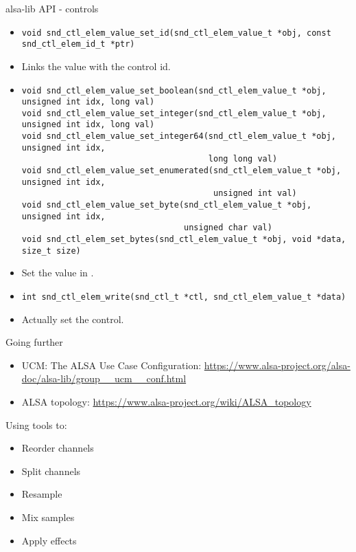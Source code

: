 \begin{frame}[fragile]{alsa-lib API - controls}
  \begin{itemize}
  \item
    \begin{block}{}
    \fontsize{9}{9}\selectfont
      \begin{verbatim}
void snd_ctl_elem_value_set_id(snd_ctl_elem_value_t *obj, const snd_ctl_elem_id_t *ptr)
      \end{verbatim}
    \end{block}
    \item Links the value with the control id.
  \item
    \begin{block}{}
    \fontsize{9}{9}\selectfont
      \begin{verbatim}
void snd_ctl_elem_value_set_boolean(snd_ctl_elem_value_t *obj, unsigned int idx, long val)
void snd_ctl_elem_value_set_integer(snd_ctl_elem_value_t *obj, unsigned int idx, long val)
void snd_ctl_elem_value_set_integer64(snd_ctl_elem_value_t *obj, unsigned int idx,
                                      long long val)
void snd_ctl_elem_value_set_enumerated(snd_ctl_elem_value_t *obj, unsigned int idx,
                                       unsigned int val)
void snd_ctl_elem_value_set_byte(snd_ctl_elem_value_t *obj, unsigned int idx,
                                 unsigned char val)
void snd_ctl_elem_set_bytes(snd_ctl_elem_value_t *obj, void *data, size_t size)
      \end{verbatim}
    \end{block}
  \item Set the value in .
  \item
    \begin{block}{}
    \fontsize{9}{9}\selectfont
      \begin{verbatim}
int snd_ctl_elem_write(snd_ctl_t *ctl, snd_ctl_elem_value_t *data)
      \end{verbatim}
    \end{block}
  \item Actually set the control.
  \end{itemize}
\end{frame}


\begin{frame}{Going further}
  \begin{itemize}
  \item UCM: The ALSA Use Case Configuration:
    \url{https://www.alsa-project.org/alsa-doc/alsa-lib/group__ucm__conf.html}
  \item ALSA topology:
    \url{https://www.alsa-project.org/wiki/ALSA_topology}
  \end{itemize}
\end{frame}

\setupdemoframe
{}
{
  Using  tools to:
  \begin{itemize}
  \item Reorder channels
  \item Split channels
  \item Resample
  \item Mix samples
  \item Apply effects
  \end{itemize}
}
